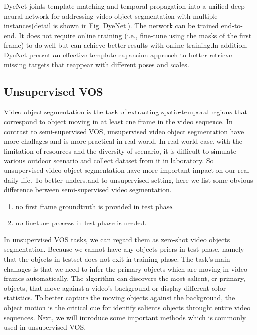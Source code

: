 DyeNet joints template matching and temporal propagation into a unified deep neural network for addressing video object segmentation with multiple instances(detail is shown in Fig.\ref{DyeNet}). The network can be trained end-to-end. It does not require online training (i.e., fine-tune using the masks of the first frame) to do well but can achieve better results with online training.In addition, DyeNet present an effective template expansion approach to better retrieve missing targets that reappear with different poses and scales.




\subsection{Unsupervised VOS}
Video object segmentation is the task of extracting spatio-temporal regions that correspond to object moving in at
least one frame in the video sequence. In contrast to semi-supervised VOS, unsupervised video object segmentation have 
more challages and is more practical in real world. In real world case, with the limitation of resources and the diversity of scenario,
it is difficult to simulate various outdoor scenario and collect dataset from it in laboratory. So unsupervised video object 
segmentation have more important impact on our real daily life. To better understand to unsupervised setting, here we list some
obvious difference between semi-supervised video segmentation.
\begin{enumerate}
    \item no first frame groundtruth is provided in test phase.
    \item no finetune process in test phase is needed.
\end{enumerate}

In unsupervised VOS tasks, we can regard them as zero-shot video objects segmentation. Because we cannot have any objects priors
in test phase, namely that the objects in testset does not exit in training phase. The task's main challages is that we need to infer
the primary objects which are moving in video frames automatically. The algorithm can discovers the most salient, or primary, objects,
that move against a video's background or display different color statistics. To better capture the moving objects against the background,
the object motion is the critical cue for identify salients objects throught entire video sequences. Next, we will introduce some important
methods which is commonly used in unsupervised VOS.

